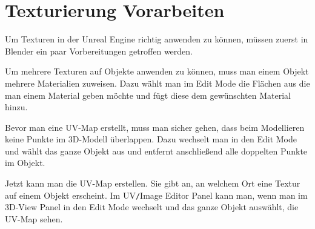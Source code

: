 \section{Texturierung Vorarbeiten}
Um Texturen in der Unreal Engine richtig anwenden zu können, müssen zuerst in Blender ein paar Vorbereitungen getroffen werden.

Um mehrere Texturen auf Objekte anwenden zu können, muss man einem Objekt mehrere Materialien zuweisen. Dazu wählt man im Edit Mode die Flächen aus die man einem Material geben
möchte und fügt diese dem gewünschten Material hinzu.

Bevor man eine UV-Map erstellt, muss man sicher gehen, dass beim Modellieren keine Punkte im 3D-Modell überlappen.
Dazu wechselt man in den Edit Mode und wählt das ganze Objekt aus und entfernt anschließend alle doppelten Punkte im Objekt.

Jetzt kann man die UV-Map erstellen. Sie gibt an, an welchem Ort eine Textur auf einem Objekt erscheint.
Im UV\verb-/-Image Editor Panel kann man, wenn man im 3D-View Panel in den Edit Mode
wechselt und das ganze Objekt auswählt, die UV-Map sehen.

